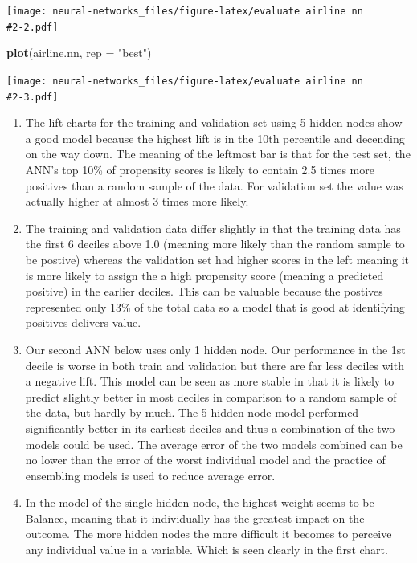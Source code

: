 \documentclass[]{article}
\newenvironment{Shaded}{\begin{snugshade}}{\end{snugshade}}
\newcommand{\KeywordTok}[1]{\textcolor[rgb]{0.13,0.29,0.53}{\textbf{#1}}}
\newcommand{\DataTypeTok}[1]{\textcolor[rgb]{0.13,0.29,0.53}{#1}}
\newcommand{\StringTok}[1]{\textcolor[rgb]{0.31,0.60,0.02}{#1}}
\newcommand{\NormalTok}[1]{#1}
\begin{document}
\texttt{[image: neural-networks\_files/figure-latex/evaluate airline nn \\\#2-2.pdf]}

\begin{Shaded}
\begin{Highlighting}[]
\KeywordTok{plot}\NormalTok{(airline.nn, }\DataTypeTok{rep =} \StringTok{"best"}\NormalTok{)}
\end{Highlighting}
\end{Shaded}

\texttt{[image: neural-networks\_files/figure-latex/evaluate airline nn \\\#2-3.pdf]}

\begin{enumerate}
\def\labelenumi{\alph{enumi}.}
\item
  The lift charts for the training and validation set using 5 hidden
  nodes show a good model because the highest lift is in the 10th
  percentile and decending on the way down. The meaning of the leftmost
  bar is that for the test set, the ANN's top 10\% of propensity scores
  is likely to contain 2.5 times more positives than a random sample of
  the data. For validation set the value was actually higher at almost 3
  times more likely.
\item
  The training and validation data differ slightly in that the training
  data has the first 6 deciles above 1.0 (meaning more likely than the
  random sample to be postive) whereas the validation set had higher
  scores in the left meaning it is more likely to assign the a high
  propensity score (meaning a predicted positive) in the earlier
  deciles. This can be valuable because the postives represented only
  13\% of the total data so a model that is good at identifying
  positives delivers value.
\item
  Our second ANN below uses only 1 hidden node. Our performance in the
  1st decile is worse in both train and validation but there are far
  less deciles with a negative lift. This model can be seen as more
  stable in that it is likely to predict slightly better in most deciles
  in comparison to a random sample of the data, but hardly by much. The
  5 hidden node model performed significantly better in its earliest
  deciles and thus a combination of the two models could be used. The
  average error of the two models combined can be no lower than the
  error of the worst individual model and the practice of ensembling
  models is used to reduce average error.
\item
  In the model of the single hidden node, the highest weight seems to be
  Balance, meaning that it individually has the greatest impact on the
  outcome. The more hidden nodes the more difficult it becomes to
  perceive any individual value in a variable. Which is seen clearly in
  the first chart.
\end{enumerate}
\end{document}
